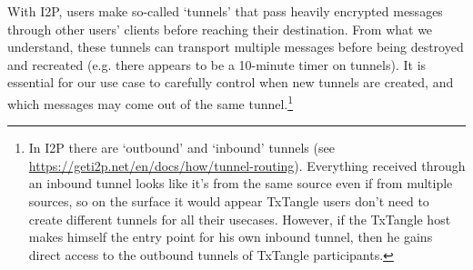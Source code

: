 With I2P, users make so-called `tunnels' that pass heavily encrypted messages through other users' clients before reaching their destination. From what we understand, these tunnels can transport multiple messages before being destroyed and recreated (e.g. there appears to be a 10-minute timer on tunnels). It is essential for our use case to carefully control when new tunnels are created, and which messages may come out of the same tunnel.\footnote{In I2P there are `outbound' and `inbound' tunnels (see \url{https://geti2p.net/en/docs/how/tunnel-routing}). Everything received through an inbound tunnel looks like it's from the same source even if from multiple sources, so on the surface it would appear TxTangle users don't need to create different tunnels for all their usecases. However, if the TxTangle host makes himself the entry point for his own inbound tunnel, then he gains direct access to the outbound tunnels of TxTangle participants.}%
